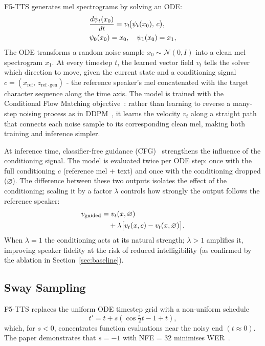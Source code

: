 \documentclass[11pt,a4paper,twocolumn]{article}
\begin{document}
F5-TTS generates mel spectrograms by solving an ODE:
\begin{align}
  &\frac{d\psi_t(x_0)}{dt} = v_t\!\bigl(\psi_t(x_0),\,c\bigr),\notag\\
  &\psi_0(x_0)=x_0,\quad \psi_1(x_0)=x_1,
  \label{eq:ode}
\end{align}
The ODE transforms a random noise sample
$x_0\sim\mathcal{N}(0,I)$ into a clean mel spectrogram $x_1$.
At every timestep $t$, the learned vector field $v_t$ tells the solver
which direction to move, given the current state and a conditioning signal
$c=(x_{\mathrm{ref}},\,z_{\mathrm{ref{\cdot}gen}})$ - the reference
speaker's mel concatenated with the target character sequence along the
time axis.
The model is trained with the Conditional Flow Matching
objective~\cite{lipman2023flow}: rather than learning to reverse a
many-step noising process as in DDPM~\cite{ho2020ddpm}, it learns the
velocity $v_t$ along a straight path that connects each noise sample to
its corresponding clean mel, making both training and inference simpler.

At inference time, classifier-free guidance (CFG)~\cite{ho2022cfg}
strengthens the influence of the conditioning signal.  The model is
evaluated twice per ODE step: once with the full conditioning $c$
(reference mel + text) and once with the conditioning dropped
($\varnothing$).  The difference between these two outputs isolates the
effect of the conditioning; scaling it by a factor $\lambda$ controls how
strongly the output follows the reference speaker:
\begin{align}
  v_{\rm guided} &= v_t(x,\varnothing)\notag\\
    &\quad+ \lambda\bigl[v_t(x,c)-v_t(x,\varnothing)\bigr].
  \label{eq:cfg}
\end{align}
When $\lambda=1$ the conditioning acts at its natural strength; $\lambda>1$
amplifies it, improving speaker fidelity at the risk of reduced
intelligibility (as confirmed by the ablation in Section~\ref{sec:baseline}).

\subsection{Sway Sampling}
\label{sec:sway}

F5-TTS replaces the uniform ODE timestep grid with a non-uniform schedule
\begin{equation}
  t' = t + s\!\left(\cos\!\tfrac{\pi}{2}t - 1 + t\right),
  \label{eq:sway}
\end{equation}
which, for $s<0$, concentrates function evaluations near the noisy end
$(t\approx 0)$.  The paper demonstrates that $s=-1$ with NFE = 32 minimises
WER~\cite{chen2025f5tts}.
\end{document}
